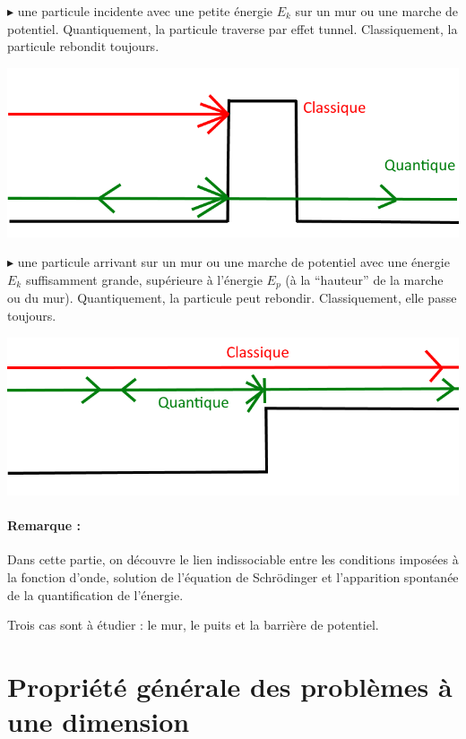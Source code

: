 \documentclass[12pt,a4paper,titlepage]{book}
\begin{document}
$\blacktriangleright$ une particule incidente avec une petite énergie $E_k$ sur un mur ou une marche de potentiel. Quantiquement, la particule traverse par effet tunnel. Classiquement, la particule rebondit toujours.

\begin{center}
\includegraphics[scale=0.3]{6-1-effet-tunnel-ok.png}
\end{center}

$\blacktriangleright$ une particule arrivant sur un mur ou une marche de potentiel avec une énergie $E_k$ suffisamment grande, supérieure à l'énergie $E_p$ (à la \enquote{hauteur} de la marche ou du mur). Quantiquement, la particule peut rebondir. Classiquement, elle passe toujours.

\begin{center}
\includegraphics[scale=0.3]{6-1-marche-potentiel-ok.png}
\end{center}

\paragraph*{Remarque :}

Dans cette partie, on découvre le lien indissociable entre les conditions imposées à la fonction d'onde, solution de l'équation de Schrödinger et l'apparition spontanée de la quantification de l'énergie.

Trois cas sont à étudier : le mur, le puits et la barrière de potentiel.

\section{Propriété générale des problèmes à une dimension}
\end{document}
